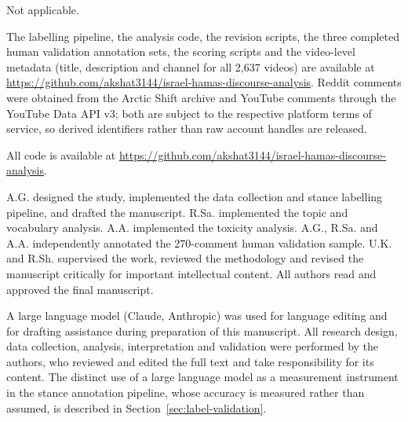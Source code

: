 \documentclass[pdflatex,sn-basic,Numbered,iicol]{sn-jnl}
\begin{document}
Not applicable.

The labelling pipeline, the analysis code, the revision scripts, the three
completed human validation annotation sets, the scoring scripts and the
video-level metadata (title, description and channel for all 2{,}637 videos) are
available at \url{https://github.com/akshat3144/israel-hamas-discourse-analysis}. Reddit comments were obtained from the
Arctic Shift archive and YouTube comments through the YouTube Data API v3; both
are subject to the respective platform terms of service, so derived identifiers
rather than raw account handles are released.

All code is available at \url{https://github.com/akshat3144/israel-hamas-discourse-analysis}.

A.G. designed the study, implemented the data collection and stance labelling
pipeline, and drafted the manuscript. R.Sa. implemented the topic and vocabulary
analysis. A.A. implemented the toxicity analysis. A.G., R.Sa. and A.A.
independently annotated the 270-comment human validation sample. U.K. and R.Sh.
supervised the work, reviewed the methodology and revised the manuscript
critically for important intellectual content. All authors read and approved the
final manuscript.

A large language model (Claude, Anthropic) was used for language editing and for
drafting assistance during preparation of this manuscript. All research design,
data collection, analysis, interpretation and validation were performed by the
authors, who reviewed and edited the full text and take responsibility for its
content. The distinct use of a large language model as a measurement instrument
in the stance annotation pipeline, whose accuracy is measured rather than
assumed, is described in Section~\ref{sec:label-validation}.


\end{document}
